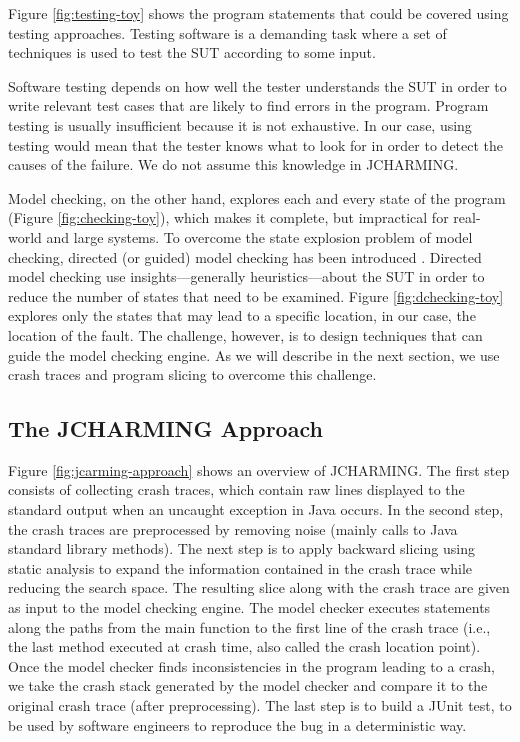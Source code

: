 Figure \ref{fig:testing-toy} shows the program statements that could be covered using testing approaches. Testing software is a demanding task where a set of techniques is used to test the SUT according to some input.

Software testing depends on how well the tester understands the SUT in order to write relevant test cases that are likely to find errors in the program. Program testing is usually insufficient because it is not exhaustive. In our case, using testing would mean that the tester knows what to look for in order to detect the causes of the failure. We do not assume this knowledge in JCHARMING. 

Model checking, on the other hand, explores each and every state of the program (Figure \ref{fig:checking-toy}), which makes it complete, but impractical for real-world and large systems. To overcome the state explosion problem of model checking, directed (or guided) model checking has been introduced \cite{Rungta2009}. Directed model checking use insights—generally heuristics—about the SUT in order to reduce the number of states that need to be examined. Figure \ref{fig:dchecking-toy} explores only the states that may lead to a specific location, in our case, the location of the fault. The challenge, however, is to design techniques that can guide the model checking engine. As we will describe in the next section, we use crash traces and program slicing to overcome this challenge.

\subsection{The JCHARMING Approach}

Figure \ref{fig:jcarming-approach} shows an overview of JCHARMING. The first step
consists of collecting crash traces, which contain raw lines
displayed to the standard output when an uncaught exception
in Java occurs. In the second step, the crash traces are
preprocessed by removing noise (mainly calls to Java standard
library methods). The next step is to apply backward slicing
using static analysis to expand the information contained in
the crash trace while reducing the search space. The resulting
slice along with the crash trace are given as input to the model
checking engine. The model checker executes statements
along the paths from the main function to the first line of the
crash trace (i.e., the last method executed at crash time, also
called the crash location point). Once the model checker finds
inconsistencies in the program leading to a crash, we take the
crash stack generated by the model checker and compare it to
the original crash trace (after preprocessing). The last step is
to build a JUnit test, to be used by software engineers to
reproduce the bug in a deterministic way.

